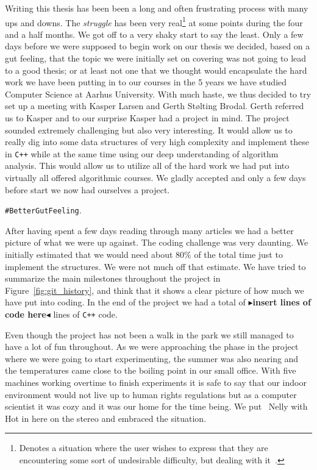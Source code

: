 \documentclass[twoside,11pt,openright]{report}
\newcommand{\todo}[1]{{\color[rgb]{.5,0,0}\textbf{$\blacktriangleright$#1$\blacktriangleleft$}}}
\begin{document}
Writing this thesis has been been a long and often frustrating process with many ups and downs. The \textit{struggle} has been very real\footnote{Denotes a situation where the user wishes to express that they are encountering some sort of undesirable difficulty, but dealing with it~\cite{real_struggle}.} at some points during the four and a half months. We got off to a very shaky start to say the least. Only a few days before we were supposed to begin work on our thesis we decided, based on a gut feeling, that the topic we were initially set on covering was not going to lead to a good thesis; or at least not one that we thought would encapsulate the hard work we have been putting in to our courses in the 5 years we have studied Computer Science at Aarhus University. With much haste, we thus decided to try set up a meeting with Kasper Larsen and Gerth St\o lting Brodal. Gerth referred us to Kasper and to our surprise Kasper had a project in mind. The project sounded extremely challenging but also very interesting. It would allow us to really dig into some  data structures of very high complexity and implement these in \texttt{C++} while at the same time using our deep understanding of algorithm analysis. This would allow us to utilize all of the hard work we had put into virtually all offered algorithmic courses. We gladly accepted and only a few days before start we now had ourselves a project.
\begin{center}
\texttt{\#BetterGutFeeling}.
\end{center}
After having spent a few days reading through many articles we had a better picture of what we were up against. The coding challenge was very daunting. We initially estimated that we would need about 80\% of the total time just to implement the structures. We were not much off that estimate. We have tried to summarize the main milestones throughout the project in Figure~\ref{fig:git_history}, and think that it shows a clear picture of how much we have put into coding. In the end of the project we had a total of \todo{insert lines of code here} lines of \texttt{C++} code.

Even though the project has not been a walk in the park we still managed to have a lot of fun throughout. As we were approaching the phase in the project where we were going to start experimenting, the summer was also nearing and the temperatures came close to the boiling point in our small office. With five machines working overtime to finish experiments it is safe to say that our indoor environment would not live up to human rights regulations but as a computer scientist it was cozy and it was our home for the time being. We put \twonotes~Nelly with Hot in here  on the stereo and embraced the situation.
\end{document}
